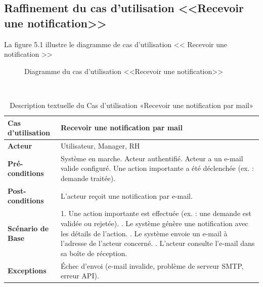 \subsection{Raffinement du cas d'utilisation <<Recevoir une notification>>}
La figure 5.1 illustre le diagramme de cas d’utilisation << Recevoir une notification >>
\begin{figure}[h]
    \centering
    \caption{Diagramme du cas d'utilisation <<Recevoir une notification>>}
    \label{fig:recnot}
\end{figure}\\
\begin{table}[!ht]
    \centering
    \caption{Description textuelle du Cas d’utilisation «Recevoir une notification par mail»}
    \label{tab:receive_email_notification}
    \renewcommand{\arraystretch}{1.2}
    \begin{tabular}{|p{4.2cm}|p{11cm}|}
    \hline
    \textbf{Cas d'utilisation} & Recevoir une notification par mail \\
    \hline
    \textbf{Acteur} & Utilisateur, Manager, RH \\
    \hline
    \textbf{Pré-conditions} & Système en marche. \newline Acteur authentifié. \newline Acteur a un e-mail valide configuré. \newline Une action importante a été déclenchée (ex. : demande traitée). \\
    \hline
    \textbf{Post-conditions} & L’acteur reçoit une notification par e-mail. \\
    \hline
    \textbf{Scénario de Base} & 
    1. Une action importante est effectuée (ex. : une demande est validée ou rejetée). \newline
    2. Le système génère une notification avec les détails de l’action. \newline
    3. Le système envoie un e-mail à l’adresse de l’acteur concerné. \newline
    4. L’acteur consulte l’e-mail dans sa boîte de réception. \\
    \hline
    \textbf{Exceptions} & 
    Échec d’envoi (e-mail invalide, problème de serveur SMTP, erreur API). \\
    \hline
    \end{tabular}
    \end{table}
